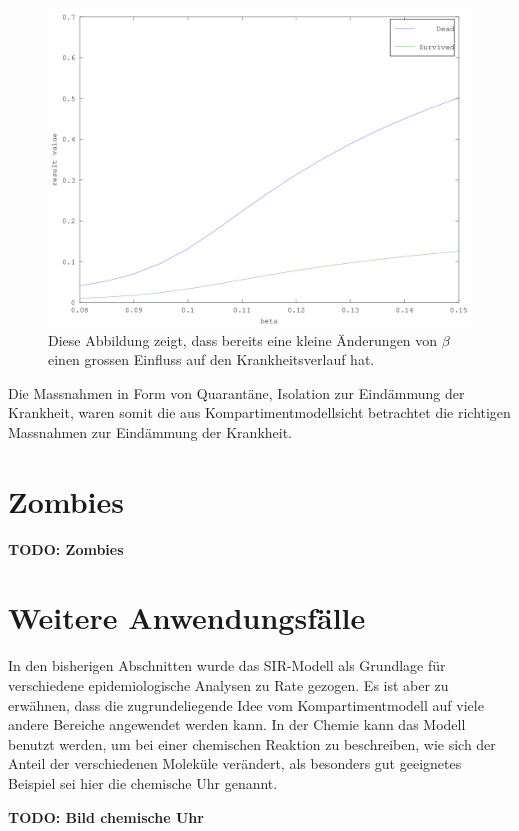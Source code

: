 \begin{refsection}
\begin{figure}[h]
	\centering
	\includegraphics[width=1\textwidth]{sir/beta_change_det.png}
  \caption[Einfluss von $\beta$ auf die Mortalitätsrate]{Diese Abbildung zeigt, dass bereits eine kleine Änderungen von $\beta$ einen grossen Einfluss auf den Krankheitsverlauf hat.}
  \label{fig:beta_change_det}
\end{figure}

Die Massnahmen in Form von Quarantäne, Isolation zur Eindämmung der Krankheit, waren somit die aus Kompartimentmodellsicht betrachtet die richtigen Massnahmen zur Eindämmung der Krankheit.

\section{Zombies}
\textbf{TODO: Zombies}

\section{Weitere Anwendungsfälle}
In den bisherigen Abschnitten wurde das SIR-Modell als Grundlage für verschiedene epidemiologische Analysen zu Rate gezogen.
Es ist aber zu erwähnen, dass die zugrundeliegende Idee vom Kompartimentmodell auf viele andere Bereiche angewendet werden kann.
In der Chemie kann das Modell benutzt werden, um bei einer chemischen Reaktion zu beschreiben, wie sich der Anteil der verschiedenen Moleküle verändert, als besonders gut geeignetes Beispiel sei hier die chemische Uhr genannt.

\textbf{TODO: Bild chemische Uhr}


\end{refsection}
